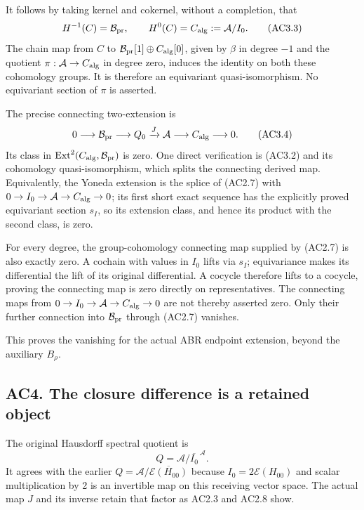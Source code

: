 It follows by taking kernel and cokernel, without a completion, that \[
 H^{-1}(C)=\mathcal B_{\rm pr},\qquad
 H^0(C)=C_{\rm alg}:=\mathcal A/I_0.
\tag{AC3.3}
\] The chain map from \(C\) to
\(\mathcal B_{\rm pr}[1]\oplus C_{\rm alg}[0]\), given by \(\beta\) in
degree \(-1\) and the quotient \(\pi:\mathcal A\to C_{\rm alg}\) in
degree zero, induces the identity on both these cohomology groups. It is
therefore an equivariant quasi-isomorphism. No equivariant section of
\(\pi\) is asserted.

The precise connecting two-extension is \[
 0\longrightarrow\mathcal B_{\rm pr}
 \longrightarrow Q_0\xrightarrow{J}\mathcal A
 \longrightarrow C_{\rm alg}\longrightarrow0.
\tag{AC3.4}
\] Its class in
\(\operatorname{Ext}^2(C_{\rm alg},\mathcal B_{\rm pr})\) is zero. One
direct verification is (AC3.2) and its cohomology quasi-isomorphism,
which splits the connecting derived map. Equivalently, the Yoneda
extension is the splice of (AC2.7) with
\(0\to I_0\to\mathcal A\to C_{\rm alg}\to0\); its first short exact
sequence has the explicitly proved equivariant section \(s_I\), so its
extension class, and hence its product with the second class, is zero.

For every degree, the group-cohomology connecting map supplied by
(AC2.7) is also exactly zero. A cochain with values in \(I_0\) lifts via
\(s_I\); equivariance makes its differential the lift of its original
differential. A cocycle therefore lifts to a cocycle, proving the
connecting map is zero directly on representatives. The connecting maps
from \(0\to I_0\to\mathcal A\to C_{\rm alg}\to0\) are not thereby
asserted zero. Only their further connection into
\(\mathcal B_{\rm pr}\) through (AC2.7) vanishes.

This proves the vanishing for the actual ABR endpoint extension, beyond
the auxiliary \(B_\rho\).

\subsection{AC4. The closure difference is a retained
object}\label{ac4.-the-closure-difference-is-a-retained-object}

The original Hausdorff spectral quotient is \[
 Q=\mathcal A/\overline{I_0}^{\,\mathcal A}.
\tag{AC4.1}
\] It agrees with the earlier
\(Q=\mathcal A/\overline{\mathcal E(H_{00})}\) because
\(I_0=2\mathcal E(H_{00})\) and scalar multiplication by 2 is an
invertible map on this receiving vector space. The actual map \(J\) and
its inverse retain that factor as AC2.3 and AC2.8 show.

